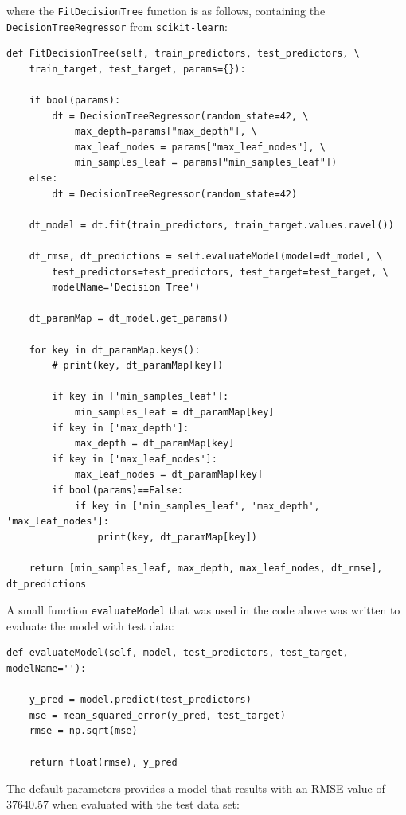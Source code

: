 \documentclass[11pt,a4paper,titlepage]{article}
\begin{document}
where the \texttt{FitDecisionTree} function is as follows, containing the \texttt{DecisionTreeRegressor} from \texttt{scikit-learn}:

\begin{verbatim}
def FitDecisionTree(self, train_predictors, test_predictors, \
    train_target, test_target, params={}):

    if bool(params):
        dt = DecisionTreeRegressor(random_state=42, \
            max_depth=params["max_depth"], \
            max_leaf_nodes = params["max_leaf_nodes"], \
            min_samples_leaf = params["min_samples_leaf"])
    else:
        dt = DecisionTreeRegressor(random_state=42)

    dt_model = dt.fit(train_predictors, train_target.values.ravel())

    dt_rmse, dt_predictions = self.evaluateModel(model=dt_model, \
        test_predictors=test_predictors, test_target=test_target, \
        modelName='Decision Tree')

    dt_paramMap = dt_model.get_params()

    for key in dt_paramMap.keys():
        # print(key, dt_paramMap[key])

        if key in ['min_samples_leaf']:
            min_samples_leaf = dt_paramMap[key]
        if key in ['max_depth']:
            max_depth = dt_paramMap[key]
        if key in ['max_leaf_nodes']:
            max_leaf_nodes = dt_paramMap[key]
        if bool(params)==False:
            if key in ['min_samples_leaf', 'max_depth', 'max_leaf_nodes']:
                print(key, dt_paramMap[key])

    return [min_samples_leaf, max_depth, max_leaf_nodes, dt_rmse], dt_predictions
\end{verbatim}

A small function \texttt{evaluateModel} that was used in the code above was written to evaluate the model with test data:

\begin{verbatim}
def evaluateModel(self, model, test_predictors, test_target, modelName=''):

    y_pred = model.predict(test_predictors)
    mse = mean_squared_error(y_pred, test_target)
    rmse = np.sqrt(mse)

    return float(rmse), y_pred
\end{verbatim}

The default parameters provides a model that results with an RMSE value of 37640.57 when evaluated with the test data set:
\end{document}
